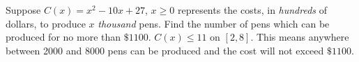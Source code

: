 {Suppose $C(x) = x^2-10x+27$, $x \geq 0$ represents the costs, in \textit{hundreds} of dollars, to produce $x$ \textit{thousand} pens.  Find the number of pens which can be produced for no more than $\$1100$.}
{$C(x) \leq 11$ on $[2,8]$.  This means anywhere between 2000 and 8000 pens can be produced and the cost will not exceed $\$1100$.}